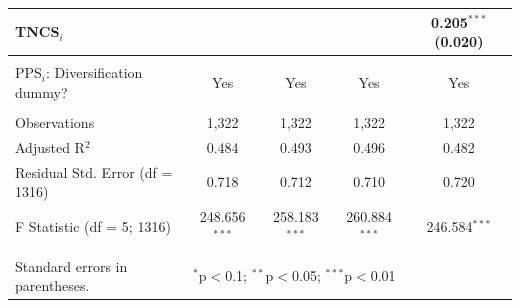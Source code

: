 \documentclass[draft,final]{vutinfth} %
\begin{document}
\begin{table}[!htbp]
\begin{tabularx}{\textwidth}{@{\extracolsep{\fill}}lcccc}
  TNCS$_{i}$ &  &  &  & 0.205$^{***}$ (0.020) \\ 
 \hline \\[-1.8ex] 
PPS$_{i}$: Diversification dummy? & Yes & Yes & Yes & Yes \\ 
\hline \\[-1.8ex] 
Observations & 1,322 & 1,322 & 1,322 & 1,322 \\ 
Adjusted R$^{2}$ & 0.484 & 0.493 & 0.496 & 0.482 \\ 
Residual Std. Error (df = 1316) & 0.718 & 0.712 & 0.710 & 0.720 \\ 
F Statistic (df = 5; 1316) & 248.656$^{***}$ & 258.183$^{***}$ & 260.884$^{***}$ & 246.584$^{***}$ \\ 
\hline 
\hline \\[-1.8ex] 
Standard errors in parentheses. & \multicolumn{4}{l}{$^{*}$p$<$0.1; $^{**}$p$<$0.05; $^{***}$p$<$0.01} \\ 
\end{tabularx} 
\end{table} 
\end{document}

